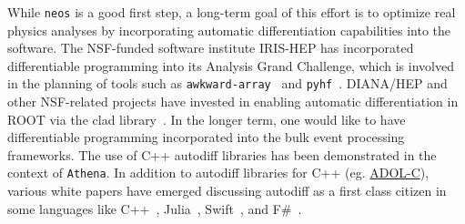\documentclass{article}
\begin{document}



While \texttt{neos} is a good first step, a long-term goal of this effort is to optimize real physics analyses by incorporating automatic differentiation capabilities into the  software. The NSF-funded software institute IRIS-HEP has incorporated differentiable programming into its Analysis Grand Challenge, which is involved in the planning of tools such as \texttt{awkward-array}~\cite{awkward_array} and \texttt{pyhf}~\cite{pyhf}. DIANA/HEP and other NSF-related projects have invested in enabling automatic differentiation in ROOT via the clad library~\cite{clad_in_root}. In the longer term, one would like to have differentiable programming incorporated into the bulk event processing frameworks. The use of C++ autodiff libraries has been demonstrated in the context of \texttt{Athena}. In addition to autodiff libraries for C++ (eg. \href{https://github.com/coin-or/ADOL-C}{ADOL-C}), various white papers have emerged discussing autodiff as a first class citizen in some languages like C++~\cite{cpp_P2072R0}, Julia~\cite{julia}, Swift~\cite{swift}, and F\#~\cite{fsharp}.





\end{document}
